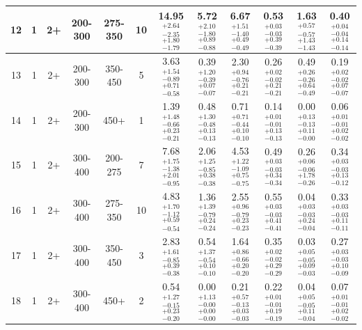 \begin{landscape}
\begin{table}[hp]
\begin{lrbox}{\resBox}
\begin{tabular}{|c|c|c|c|c||c|c||c|c|c|c|c|}
 \hline
             12 &               1 &              2+ &         200-300 &         275-350  &     10 &  14.95 $^{+2.64}_{-2.35}$ $^{+1.80}_{-1.79}$ &   5.72 $^{+2.10}_{-1.80}$ $^{+0.89}_{-0.88}$ &   6.67 $^{+1.51}_{-1.40}$ $^{+0.49}_{-0.49}$ &   0.53 $^{+0.03}_{-0.03}$ $^{+0.39}_{-0.39}$ &   1.63 $^{+0.57}_{-0.57}$ $^{+1.43}_{-1.43}$ &   0.40 $^{+0.04}_{-0.04}$ $^{+0.14}_{-0.14}$ \\
 \hline
             13 &               1 &              2+ &         200-300 &         350-450  &      5 &   3.63 $^{+1.54}_{-0.89}$ $^{+0.71}_{-0.58}$ &   0.39 $^{+1.20}_{-0.39}$ $^{+0.07}_{-0.07}$ &   2.30 $^{+0.94}_{-0.76}$ $^{+0.21}_{-0.21}$ &   0.26 $^{+0.02}_{-0.02}$ $^{+0.21}_{-0.21}$ &   0.49 $^{+0.26}_{-0.26}$ $^{+0.64}_{-0.49}$ &   0.19 $^{+0.02}_{-0.02}$ $^{+0.07}_{-0.07}$ \\
 \hline
             14 &               1 &              2+ &         200-300 &            450+  &      1 &   1.39 $^{+1.48}_{-0.66}$ $^{+0.23}_{-0.21}$ &   0.48 $^{+1.30}_{-0.48}$ $^{+0.13}_{-0.13}$ &   0.71 $^{+0.71}_{-0.44}$ $^{+0.10}_{-0.10}$ &   0.14 $^{+0.01}_{-0.01}$ $^{+0.13}_{-0.13}$ &   0.00 $^{+0.13}_{-0.13}$ $^{+0.11}_{-0.00}$ &   0.06 $^{+0.01}_{-0.01}$ $^{+0.02}_{-0.02}$ \\
 \hline
             15 &               1 &              2+ &         300-400 &         200-275  &      7 &   7.68 $^{+1.75}_{-1.38}$ $^{+2.01}_{-0.95}$ &   2.06 $^{+1.25}_{-0.85}$ $^{+0.38}_{-0.38}$ &   4.53 $^{+1.22}_{-1.09}$ $^{+0.75}_{-0.75}$ &   0.49 $^{+0.03}_{-0.03}$ $^{+0.34}_{-0.34}$ &   0.26 $^{+0.06}_{-0.06}$ $^{+1.78}_{-0.26}$ &   0.34 $^{+0.03}_{-0.03}$ $^{+0.13}_{-0.12}$ \\
 \hline
             16 &               1 &              2+ &         300-400 &         275-350  &     10 &   4.83 $^{+1.70}_{-1.12}$ $^{+0.59}_{-0.54}$ &   1.36 $^{+1.39}_{-0.79}$ $^{+0.24}_{-0.24}$ &   2.55 $^{+0.96}_{-0.79}$ $^{+0.23}_{-0.23}$ &   0.55 $^{+0.03}_{-0.03}$ $^{+0.41}_{-0.41}$ &   0.04 $^{+0.03}_{-0.03}$ $^{+0.24}_{-0.04}$ &   0.33 $^{+0.03}_{-0.03}$ $^{+0.11}_{-0.11}$ \\
 \hline
             17 &               1 &              2+ &         300-400 &         350-450  &      3 &   2.83 $^{+1.61}_{-0.85}$ $^{+0.39}_{-0.38}$ &   0.54 $^{+1.37}_{-0.54}$ $^{+0.10}_{-0.10}$ &   1.64 $^{+0.86}_{-0.66}$ $^{+0.20}_{-0.20}$ &   0.35 $^{+0.02}_{-0.02}$ $^{+0.29}_{-0.29}$ &   0.03 $^{+0.05}_{-0.05}$ $^{+0.09}_{-0.03}$ &   0.27 $^{+0.03}_{-0.03}$ $^{+0.10}_{-0.09}$ \\
 \hline
             18 &               1 &              2+ &         300-400 &            450+  &      2 &   0.54 $^{+1.27}_{-0.15}$ $^{+0.23}_{-0.20}$ &   0.00 $^{+1.13}_{-0.00}$ $^{+0.00}_{-0.00}$ &   0.21 $^{+0.57}_{-0.13}$ $^{+0.03}_{-0.03}$ &   0.22 $^{+0.01}_{-0.01}$ $^{+0.19}_{-0.19}$ &   0.04 $^{+0.05}_{-0.05}$ $^{+0.11}_{-0.04}$ &   0.07 $^{+0.01}_{-0.01}$ $^{+0.02}_{-0.02}$ \\

\end{tabular}
\end{lrbox}
\end{table}
\end{landscape}
